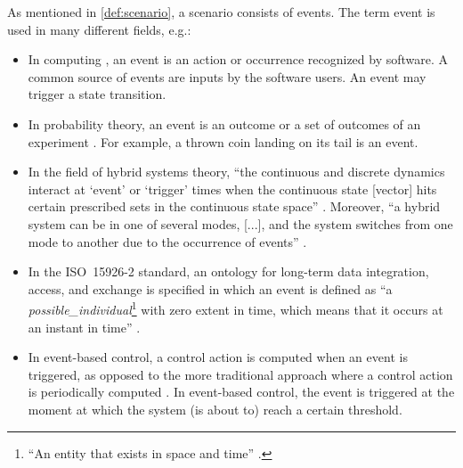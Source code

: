 As mentioned in \cref{def:scenario}, a scenario consists of events. 
The term event is used in many different fields, e.g.:
\begin{itemize}
	\item In computing \autocite{breu1997towards}, an event is an action or occurrence recognized by software. A common source of events are inputs by the software users. An event may trigger a state transition.
	
	\item In probability theory, an event is an outcome or a set of outcomes of an experiment \autocite{pfeiffer2013concepts}. For example, a thrown coin landing on its tail is an event.
	
	
	\item In the field of hybrid systems theory, ``the continuous and discrete dynamics interact at `event' or `trigger' times when the continuous state [vector] hits certain prescribed sets in the continuous state space'' \autocite{branicky1998hybridcontrol}. Moreover, ``a hybrid system can be in one of several modes, [...], and the system switches from one mode to another due to the occurrence of events'' \autocite{deschutter2000optimal}.
	
	\cstartb\item In the ISO~15926-2 standard, an ontology for long-term data integration, access, and exchange is specified in which an event is defined as ``a \emph{possible\_individual}\footnote{\cstartb ``An entity that exists in space and time'' \autocite{batres2007upper}.\cendb} with zero extent in time, which means that it occurs at an instant in time'' \autocite{batres2007upper}. \cendb
	
	\item In event-based control, a control action is computed when an event is triggered, as opposed to the more traditional approach where a control action is periodically computed \autocite{heemels2012eventcontrol}. In event-based control, the event is triggered at the moment at which the system (is about to) reach a certain threshold.
\end{itemize}

